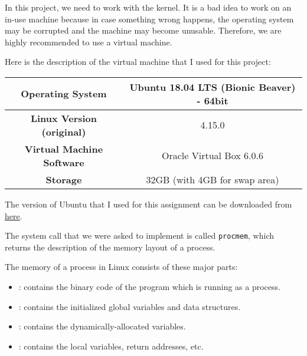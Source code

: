     \par In this project, we need to work with the kernel. It is a bad idea to work on an in-use machine because in case something wrong happens, the operating system may be corrupted and the machine may become unusable. Therefore, we are highly recommended to use a virtual machine.
    \par Here is the description of the virtual machine that I used for this project:
    \begin{center}
      \begin{tabular}{|c|c|}
      \hline
      \textbf{Operating System}         & Ubuntu 18.04 LTS (Bionic Beaver) - 64bit \\ \hline
      \textbf{Linux Version (original)} & 4.15.0                                   \\ \hline
      \textbf{Virtual Machine Software} & Oracle Virtual Box 6.0.6                 \\ \hline
      \textbf{Storage}                  & 32GB (with 4GB for swap area)            \\ \hline
      \end{tabular}
    \end{center}
    \par The version of Ubuntu that I used for this assignment can be downloaded from \href{https://help.ubuntu.com/community/Installation/MinimalCD}{here}.

    \par The system call that we were asked to implement is called \lstinline{procmem}, which returns the description of the memory layout of a process.

      \par The memory of a process in Linux consists of these major parts:
      \begin{itemize}
        \item {}: contains the binary code of the program which is running as a process.
        \item {}: contains the initialized global variables and data structures.
        \item {}: contains the dynamically-allocated variables.
        \item {}: contains the local variables, return addresses, etc.
      \end{itemize}


